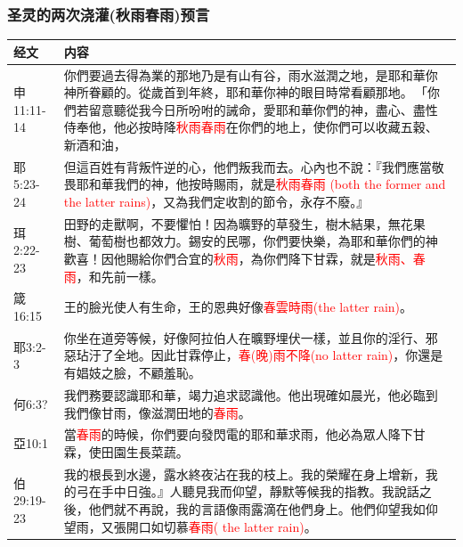 \subsubsection{圣灵的两次浇灌(秋雨春雨)预言}
\begin{table}[H]
\centering
\begin{tabular}{p{4em}|p{44em}}  \toprule
经文&内容 \\  \midrule
申11:11-14&你們要過去得為業的那地乃是有山有谷，雨水滋潤之地，是耶和華你神所眷顧的。從歲首到年終，耶和華你神的眼目時常看顧那地。 「你們若留意聽從我今日所吩咐的誡命，愛耶和華你們的神，盡心、盡性侍奉他，他必按時降\textcolor{red}{秋雨春雨}在你們的地上，使你們可以收藏五穀、新酒和油，\\  \midrule
耶5:23-24&但這百姓有背叛忤逆的心，他們叛我而去。心內也不說：『我們應當敬畏耶和華我們的神，他按時賜雨，就是\textcolor{red}{秋雨春雨 (both the former and the latter rains)}，又為我們定收割的節令，永存不廢。』\\  \midrule

珥2:22-23&田野的走獸啊，不要懼怕！因為曠野的草發生，樹木結果，無花果樹、葡萄樹也都效力。錫安的民哪，你們要快樂，為耶和華你們的神歡喜！因他賜給你們合宜的\textcolor{red}{秋雨}，為你們降下甘霖，就是\textcolor{red}{秋雨、春雨}，和先前一樣。\\  \midrule

箴16:15&王的臉光使人有生命，王的恩典好像\textcolor{red}{春雲時雨(the latter rain)}。\\  \midrule



耶3:2-3&你坐在道旁等候，好像阿拉伯人在曠野埋伏一樣，並且你的淫行、邪惡玷汙了全地。因此甘霖停止，\textcolor{red}{春(晚)雨不降(no latter rain)}，你還是有娼妓之臉，不顧羞恥。\\  \midrule

何6:3?&我們務要認識耶和華，竭力追求認識他。他出現確如晨光，他必臨到我們像甘雨，像滋潤田地的\textcolor{red}{春雨}。\\  \midrule

亞10:1&當\textcolor{red}{春雨}的時候，你們要向發閃電的耶和華求雨，他必為眾人降下甘霖，使田園生長菜蔬。\\  \midrule

伯29:19-23&我的根長到水邊，露水終夜沾在我的枝上。我的榮耀在身上增新，我的弓在手中日強。』人聽見我而仰望，靜默等候我的指教。我說話之後，他們就不再說，我的言語像雨露滴在他們身上。他們仰望我如仰望雨，又張開口如切慕\textcolor{red}{春雨( the latter rain)}。\\  \midrule
\end{tabular}%
\end{table}




